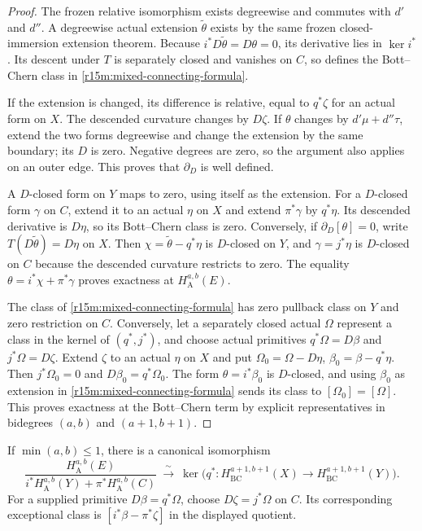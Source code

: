 \begin{proof}
The frozen relative isomorphism exists degreewise and
commutes with $d'$ and $d''$.  A degreewise actual
extension $\widetilde\theta$ exists by the same frozen
closed-immersion extension theorem.
Because $i^*D\widetilde\theta=D\theta=0$,
its derivative lies in $\ker i^*$.
Its descent under $T$ is separately closed and vanishes
on $C$, so defines the Bott--Chern class in
\eqref{r15m:mixed-connecting-formula}.

If the extension is changed, its difference is relative,
equal to $q^*\zeta$ for an actual form on $X$.
The descended curvature changes by $D\zeta$.
If $\theta$ changes by $d'\mu+d''\tau$, extend the two
forms degreewise and change the extension by the same
boundary; its $D$ is zero.  Negative degrees are zero,
so the argument also applies on an outer edge.
This proves that $\partial_D$ is well defined.

A $D$-closed form on $Y$ maps to zero, using itself as
the extension.  For a $D$-closed form $\gamma$ on $C$,
extend it to an actual $\eta$ on $X$ and extend
$\pi^*\gamma$ by $q^*\eta$.  Its descended derivative
is $D\eta$, so its Bott--Chern class is zero.
Conversely, if $\partial_D[\theta]=0$, write
$T(D\widetilde\theta)=D\eta$ on $X$.
Then $\chi=\widetilde\theta-q^*\eta$ is $D$-closed
on $Y$, and $\gamma=j^*\eta$ is $D$-closed on $C$
because the descended curvature restricts to zero.
The equality $\theta=i^*\chi+\pi^*\gamma$ proves
exactness at $H_{\mathrm A}^{a,b}(E)$.

The class of \eqref{r15m:mixed-connecting-formula} has
zero pullback class on $Y$ and zero restriction on $C$.
Conversely, let a separately closed actual $\Omega$
represent a class in the kernel of $(q^*,j^*)$, and choose
actual primitives
$q^*\Omega=D\beta$ and $j^*\Omega=D\zeta$.
Extend $\zeta$ to an actual $\eta$ on $X$ and put
$\Omega_0=\Omega-D\eta$, $\beta_0=\beta-q^*\eta$.
Then $j^*\Omega_0=0$ and $D\beta_0=q^*\Omega_0$.
The form $\theta=i^*\beta_0$ is $D$-closed, and using
$\beta_0$ as extension in
\eqref{r15m:mixed-connecting-formula} sends its class
to $[\Omega_0]=[\Omega]$.
This proves exactness at the Bott--Chern term by explicit
representatives in bidegrees $(a,b)$ and $(a+1,b+1)$.
\end{proof}

\begin{corollary}
\label{r15m:normalized-quotient}
If $\min(a,b)\leq1$, there is a canonical isomorphism
\[
 \frac{H_{\mathrm A}^{a,b}(E)}
      {i^*H_{\mathrm A}^{a,b}(Y)+\pi^*H_{\mathrm A}^{a,b}(C)}
 \ \xrightarrow{\ \sim\ }\
 \ker\bigl(q^*:H_{\mathrm{BC}}^{a+1,b+1}(X)
                 \longrightarrow H_{\mathrm{BC}}^{a+1,b+1}(Y)\bigr).
\tag{SD15.8}\label{r15m:quotient}
\]
For a supplied primitive $D\beta=q^*\Omega$, choose
$D\zeta=j^*\Omega$ on $C$.  Its corresponding
exceptional class is
$[i^*\beta-\pi^*\zeta]$ in the displayed quotient.
\end{corollary}

